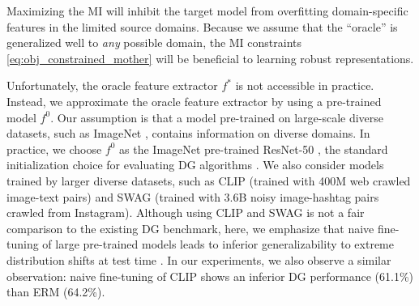 Maximizing the MI will inhibit the target model from overfitting domain-specific features in the limited source domains. Because we assume that the ``oracle'' is generalized well to \textit{any} possible domain, the MI constraints \eqref{eq:obj_constrained_mother} will be beneficial to learning robust representations.


Unfortunately, the oracle feature extractor $f^{*}$ is not accessible in practice. Instead, we approximate the oracle feature extractor by using a pre-trained model $f^{0}$.
Our assumption is that a model pre-trained on large-scale diverse datasets, such as ImageNet \cite{russakovsky2015imagenet}, contains information on diverse domains.
In practice, we choose $f^{0}$ as the ImageNet pre-trained ResNet-50 \cite{he2016_cvpr_resnet}, the standard initialization choice for evaluating DG algorithms \cite{gulrajani2020domainbed}. We also consider models trained by larger diverse datasets, such as CLIP \cite{radford2021clip} (trained with 400M web crawled image-text pairs) and SWAG \cite{singh2022swag} (trained with 3.6B noisy image-hashtag pairs crawled from Instagram).
Although using CLIP and SWAG is not a fair comparison to the existing DG benchmark, here, we emphasize that naive fine-tuning of large pre-trained models leads to inferior generalizability to extreme distribution shifts at test time \cite{wortsman2021robust, kumar2022iclr_finetuning_distort}.
In our experiments, we also observe a similar observation: naive fine-tuning of CLIP shows an inferior DG performance (61.1\%) than ERM (64.2\%).

